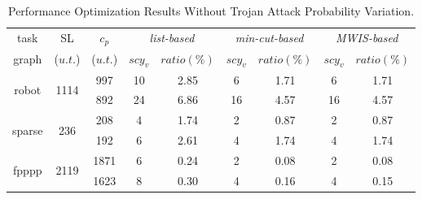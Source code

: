 \documentclass[10pt,journal]{IEEEtran}
\begin{document}
\begin{table}[!h]
\renewcommand{\arraystretch}{1.1}
\caption{Performance Optimization Results Without Trojan Attack Probability Variation.}
\centering
\begin{tabular}{c|c|c|c|c|c|c|c|c}
\hline
\hline
task                             &SL           &$c_p$        & \multicolumn{2}{c|}{\textit{list-based}}        &\multicolumn{2}{c|}{\textit{min-cut-based}}   &\multicolumn{2}{c}{\textit{MWIS-based}}        \\  \cline{4-5} \cline{6-7} \cline{8-9}
graph                                                   &\hspace*{-1em}($u.t.$)\hspace*{-1em}         &($u.t.$)       &\hspace*{-1em}$scy_v$\hspace*{-1em}     & \hspace*{-0.6em}$ratio(\%)$\hspace*{-0.6em}  &$scy_v$     &\hspace*{-0.6em}$ratio(\%)$\hspace*{-0.6em}   &\hspace*{-1em}$scy_v$\hspace*{-1em}     &\hspace*{-0.6em}$ratio(\%)$\hspace*{-0.6em}   \\

\hline
\hline

\multicolumn{1}{c|}{\multirow{2}{*}{robot}}               &\multicolumn{1}{c|}{\multirow{2}{*}{\hspace*{-1em}1114\hspace*{-1em}}}      &997  &10     &2.85   &6   &1.71   &6   &1.71    \\
   &      &892   &24  &6.86  &16   &4.57    &16  &4.57 \\

\hline
\multicolumn{1}{c|}{\multirow{2}{*}{sparse}}              &\multicolumn{1}{c|}{\multirow{2}{*}{236}}        &208  &4  &1.74   &2   &0.87    &2   &0.87   \\
   &     &192   &6  &2.61  &4   &1.74  &4    &1.74  \\

\hline
\multicolumn{1}{c|}{\multirow{2}{*}{fpppp}}            &\multicolumn{1}{c|}{\multirow{2}{*}{\hspace*{-1em}2119\hspace*{-1em}}}  &\hspace*{-0.5em}1871\hspace*{-0.5em}  &6 &0.24  &2   &0.08  &2   &0.08  \\
   &       &\hspace*{-0.5em}1623\hspace*{-0.5em}   &8 &0.30   &4   &0.16  &4  &0.15 \\


\end{tabular}
\end{table}
\end{document}
